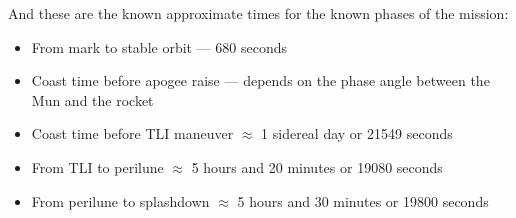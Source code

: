 \documentclass[11pt, a4paper]{article}
\begin{document}
And these are the known approximate times for the known phases of the
mission:
\begin{itemize}
\item{From mark to stable orbit} --- 680 seconds
\item{Coast time before apogee raise} --- depends on the phase angle
  between the Mun and the rocket
\item{Coast time before TLI maneuver} $\approx$ 1 sidereal day or
  21549 seconds
\item{From TLI to perilune} $\approx$ 5 hours and 20 minutes or 19080
  seconds
\item{From perilune to splashdown} $\approx$ 5 hours and 30 minutes or
  19800 seconds
\end{itemize}
\end{document}
